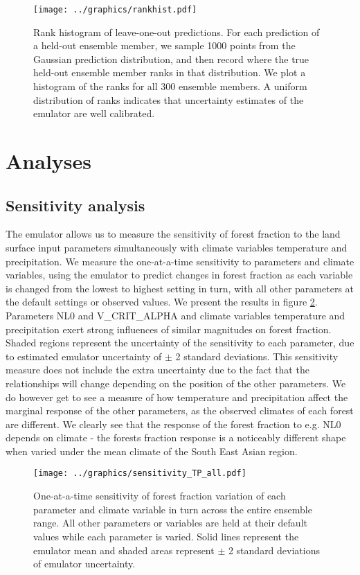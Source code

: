 \documentclass[gmd, manuscript]{copernicus}
\begin{document}
\begin{figure}[t]
\texttt{[image: ../graphics/rankhist.pdf]}
\caption{Rank histogram of leave-one-out predictions. For each prediction of a held-out ensemble member, we sample 1000 points from the Gaussian prediction distribution, and then record where the true held-out ensemble member ranks in that distribution. We plot a histogram of the ranks for all 300 ensemble members. A uniform distribution of ranks indicates that uncertainty estimates of the emulator are well calibrated.
}
\label{fig:rankhist}
\end{figure}

\section{Analyses}

\subsection{Sensitivity analysis}
The emulator allows us to measure the sensitivity of forest fraction to the land surface input parameters simultaneously with climate variables temperature and precipitation. We measure the one-at-a-time sensitivity to parameters and climate variables, using the emulator to predict changes in forest fraction as each variable is changed from the lowest to highest setting in turn, with all other parameters at the default settings or observed values. We present the results in figure \ref{fig:sensitivity_TP_all}. Parameters NL0 and V\_CRIT\_ALPHA and climate variables temperature and precipitation exert strong influences of similar magnitudes on forest fraction. Shaded regions represent the uncertainty of the sensitivity to each parameter, due to estimated emulator uncertainty of $\pm$ 2 standard deviations. This sensitivity measure does not include the extra uncertainty due to the fact that the relationships will change depending on the position of the other parameters. We do however get to see a measure of how temperature and precipitation affect the marginal response of the other parameters, as the observed climates of each forest are different. We clearly see that the response of the forest fraction to e.g. NL0 depends on climate - the forests fraction response is a noticeably different shape when varied under the mean climate of the South East Asian region.

\begin{figure}[t]
\texttt{[image: ../graphics/sensitivity\_TP\_all.pdf]}
\caption{One-at-a-time sensitivity of forest fraction variation of each parameter and climate variable in turn across the entire ensemble range. All other parameters or variables are held at their default values while each parameter is varied. Solid lines represent the emulator mean and shaded areas represent $\pm$ 2 standard deviations of emulator uncertainty.
}
\label{fig:sensitivity_TP_all}
\end{figure}
\end{document}
